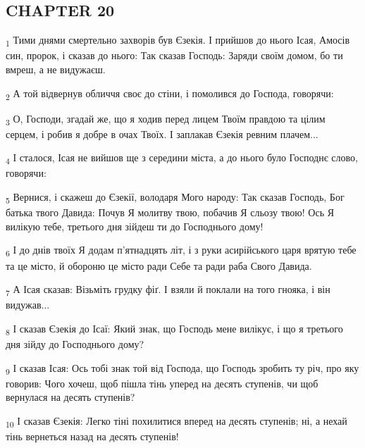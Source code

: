 \subsection{CHAPTER 20}
\begin{tcolorbox}
\textsubscript{1} Тими днями смертельно захворів був Єзекія. І прийшов до нього Ісая, Амосів син, пророк, і сказав до нього: Так сказав Господь: Заряди своїм домом, бо ти вмреш, а не видужаєш.
\end{tcolorbox}
\begin{tcolorbox}
\textsubscript{2} А той відвернув обличчя своє до стіни, і помолився до Господа, говорячи:
\end{tcolorbox}
\begin{tcolorbox}
\textsubscript{3} О, Господи, згадай же, що я ходив перед лицем Твоїм правдою та цілим серцем, і робив я добре в очах Твоїх. І заплакав Єзекія ревним плачем...
\end{tcolorbox}
\begin{tcolorbox}
\textsubscript{4} І сталося, Ісая не вийшов ще з середини міста, а до нього було Господнє слово, говорячи:
\end{tcolorbox}
\begin{tcolorbox}
\textsubscript{5} Вернися, і скажеш до Єзекії, володаря Мого народу: Так сказав Господь, Бог батька твого Давида: Почув Я молитву твою, побачив Я сльозу твою! Ось Я вилікую тебе, третього дня зійдеш ти до Господнього дому!
\end{tcolorbox}
\begin{tcolorbox}
\textsubscript{6} І до днів твоїх Я додам п'ятнадцять літ, і з руки асирійського царя врятую тебе та це місто, й обороню це місто ради Себе та ради раба Свого Давида.
\end{tcolorbox}
\begin{tcolorbox}
\textsubscript{7} А Ісая сказав: Візьміть грудку фіґ. І взяли й поклали на того гнояка, і він видужав...
\end{tcolorbox}
\begin{tcolorbox}
\textsubscript{8} І сказав Єзекія до Ісаї: Який знак, що Господь мене вилікує, і що я третього дня зійду до Господнього дому?
\end{tcolorbox}
\begin{tcolorbox}
\textsubscript{9} І сказав Ісая: Ось тобі знак той від Господа, що Господь зробить ту річ, про яку говорив: Чого хочеш, щоб пішла тінь уперед на десять ступенів, чи щоб вернулася на десять ступенів?
\end{tcolorbox}
\begin{tcolorbox}
\textsubscript{10} І сказав Єзекія: Легко тіні похилитися вперед на десять ступенів; ні, а нехай тінь вернеться назад на десять ступенів!
\end{tcolorbox}
